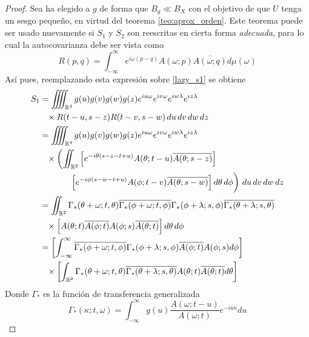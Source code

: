 \documentclass[12pt,letterpaper]{book}
\newcommand{\R}{\mathbb{R}}
\newcommand{\intR}{\int_{-\infty}^{\infty}}
\newcommand{\pheq}{\phantom{=}}
\begin{document}
\begin{proof}
Sea ha elegido a $g$ de forma que $B_g \ll B_X$ con el objetivo de que $U$ tenga un sesgo pequeño, en virtud del teorema \ref{teo:aprox_orden}. Este teorema puede ser usado nuevamente si $S_1$ y $S_2$ son reescritas en cierta forma \textit{adecuada}, para lo cual la autocovarianza debe ser vista como
\begin{equation}
R(p,q) = \intR e^{i \omega (p-q)} A(\omega; p)\overline{A(\omega; q)} d\mu(\omega) 
\end{equation}
Así pues, reemplazando esta expresión sobre \ref{lazy_s1} se obtiene
\begingroup
\allowdisplaybreaks
\begin{align}
S_1 &=
\iiiint_{\R^{4}} g(u) g(v) g(w) g(z) e^{i u \omega} e^{i v \omega} e^{i w \lambda} e^{i z \lambda} \nonumber\\
&\pheq \times R(t-u,s-z)R(t-v,s-w)\, du\, dv\, dw\, dz \nonumber \\
&= 
\iiiint_{\R^{4}} g(u) g(v) g(w) g(z) e^{i u \omega} e^{i v \omega} e^{i w \lambda} e^{i z \lambda} \nonumber\\
&\pheq \times \left( 
\iint_{\R^{2}} 
\left[ 
e^{-i \theta (s-z-t+u)} A(\theta; t-u) \overline{A(\theta; s-z)} 
\right] 
\right. \nonumber \\
&\pheq 
\left. \vphantom{\int} \phantom{times}
\left[ e^{-i \phi (s-w-t+u)} A(\phi; t-v) \overline{A(\theta; s-w)} \right] d\theta\, d\phi
\right)\, du\, dv\, dw\, dz 
\nonumber\\
 &= \iint_{\R^{2}} \Gamma_*(\theta+ \omega; t, \theta) \overline{\Gamma_*(\phi + \omega; t, \phi)}
 \Gamma_*(\phi+ \lambda; s, \phi) \overline{\Gamma_*(\theta + \lambda; s, \theta)} \nonumber \\
 &\pheq \times
 \left[
 A(\theta; t) \overline{A(\phi; t)} A(\phi; s) \overline{A(\theta; t)}
 \right] d\theta\, d\phi
\nonumber \\
 &= \left[ \intR \overline{\Gamma_*(\phi + \omega; t, \phi)} \Gamma_*(\phi+ \lambda; s, \phi)
 \overline{A(\phi; t)} A(\phi; s) d\phi \right] \nonumber \\
 &\pheq \times \left[ \int_{\R^{2}} \Gamma_*(\theta+ \omega; t, \theta) 
  \overline{\Gamma_*(\theta + \lambda; s, \theta)}  
 A(\theta; t)   \overline{A(\theta; t)} d\theta \right] 
\label{lazy_s1_2}
\end{align}
\endgroup
Donde $\Gamma_*$ es la función de transferencia generalizada
\begin{equation}
\Gamma_*(\kappa; t, \omega) = \intR g(u) \frac{A(\omega; t-u)}{A(\omega; t)} e^{-i u \kappa} du
\end{equation}

\end{proof}
\end{document}
